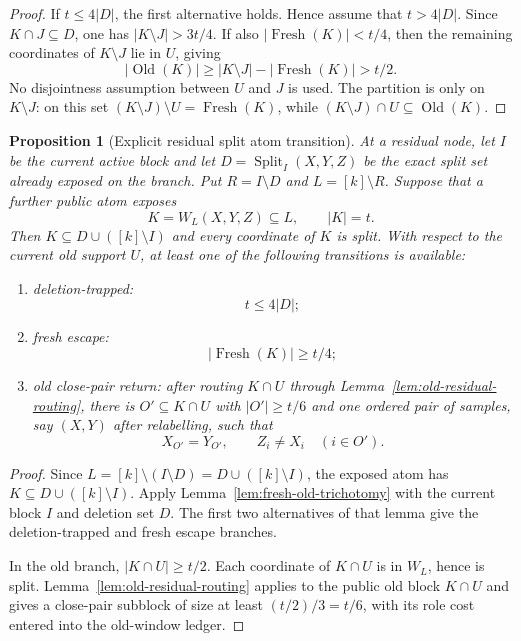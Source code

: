 \documentclass[11pt]{article}
\newtheorem{proposition}[theorem]{Proposition}
\newcommand{\Split}{\operatorname{Split}}
\begin{document}
\begin{proof}
If $t\le4|D|$, the first alternative holds.  Hence assume
that $t>4|D|$.
Since $K\cap J\subseteq D$, one has
 $|K\setminus J|>3t/4$.  If also
$|\operatorname{Fresh}(K)|<t/4$, then the remaining coordinates of
$K\setminus J$ lie in $U$, giving
\[
  |\operatorname{Old}(K)|\ge |K\setminus J|-|\operatorname{Fresh}(K)|>t/2.
\]
No disjointness assumption between $U$ and $J$ is used.  The partition is only
on $K\setminus J$: on this set
$(K\setminus J)\setminus U=\operatorname{Fresh}(K)$, while
$(K\setminus J)\cap U\subseteq\operatorname{Old}(K)$.
\end{proof}

\begin{proposition}[Explicit residual split atom transition]
\label{prop:explicit-residual-atom}
At a residual node, let $I$ be the current active block and let
$D=\Split_I(X,Y,Z)$ be the exact split set already exposed on the branch.
Put $R=I\setminus D$ and $L=[k]\setminus R$.  Suppose that a further public
atom exposes
\[
  K=W_L(X,Y,Z)\subseteq L,\qquad |K|=t .
\]
Then $K\subseteq D\cup([k]\setminus I)$ and every coordinate of $K$ is split.
With respect to the current old support $U$, at least one of the following
transitions is available:
\begin{enumerate}[label=\textup{(\arabic*)}]
\item deletion-trapped:
  \[
    t\le 4|D|;
  \]
\item fresh escape:
  \[
    |\operatorname{Fresh}(K)|\ge t/4;
  \]
\item old close-pair return: after routing $K\cap U$ through
  Lemma~\ref{lem:old-residual-routing}, there is
  $O'\subseteq K\cap U$ with $|O'|\ge t/6$ and one ordered pair of samples,
  say $(X,Y)$ after relabelling, such that
  \[
    X_{O'}=Y_{O'},\qquad Z_i\ne X_i\quad(i\in O').
  \]
\end{enumerate}
\end{proposition}

\begin{proof}
Since $L=[k]\setminus(I\setminus D)=D\cup([k]\setminus I)$, the exposed atom
has $K\subseteq D\cup([k]\setminus I)$.  Apply
Lemma~\ref{lem:fresh-old-trichotomy} with the current block $I$ and deletion
set $D$.  The first two alternatives of that lemma give the deletion-trapped
and fresh escape branches.

In the old branch, $|K\cap U|\ge t/2$.  Each coordinate of $K\cap U$ is in
$W_L$, hence is split.  Lemma~\ref{lem:old-residual-routing} applies to the
public old block $K\cap U$ and gives a close-pair subblock of size at least
$(t/2)/3=t/6$, with its role cost entered into the old-window ledger.
\end{proof}
\end{document}
